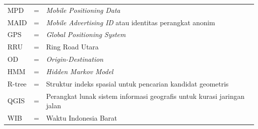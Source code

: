 \begin{tabular}{llp{3in}}
MPD & \hspace{1.5cm} = & \textit{Mobile Positioning Data} \\
MAID & \hspace{1.5cm} = & \textit{Mobile Advertising ID} atau identitas perangkat anonim \\
GPS & \hspace{1.5cm} = & \textit{Global Positioning System} \\
RRU & \hspace{1.5cm} = & Ring Road Utara \\
OD & \hspace{1.5cm} = & \textit{Origin-Destination} \\
HMM & \hspace{1.5cm} = & \textit{Hidden Markov Model} \\
R-tree & \hspace{1.5cm} = & Struktur indeks spasial untuk pencarian kandidat geometris \\
QGIS & \hspace{1.5cm} = & Perangkat lunak sistem informasi geografis untuk kurasi jaringan jalan \\
WIB & \hspace{1.5cm} = & Waktu Indonesia Barat \\
\end{tabular}
